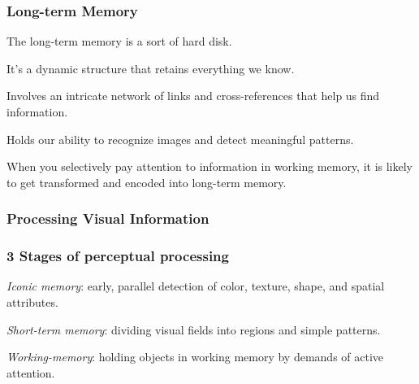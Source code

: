 \documentclass[12pt]{beamer}\usepackage[]{graphicx}\usepackage[]{color}
\begin{document}

\begin{frame}
\frametitle{Long-term Memory}

\bbi
  \item The long-term memory is a sort of hard disk.
  \item It's a dynamic structure that retains everything we know.
  \item Involves an intricate network of links and cross-references that help
  us find information.
  \item Holds our ability to recognize images and detect meaningful patterns.
  \item When you selectively pay attention to information in working memory,
  it is likely to get transformed and encoded into long-term memory.
\ei

\end{frame}


\begin{frame}
\frametitle{Processing Visual Information}
\begin{center}
\end{center}
\end{frame}


\begin{frame}
\frametitle{3 Stages of perceptual processing}

\bbi
  \item \textit{Iconic memory}: early, parallel detection of color, texture, 
  shape, and spatial attributes.
  \item \textit{Short-term memory}: dividing visual fields into regions and 
  simple patterns.
  \item \textit{Working-memory}: holding objects in working memory by demands 
  of active attention.
\ei

\end{frame}


\begin{frame}
\begin{center}
\Huge{}
\end{center}
\end{frame}
\end{document}
